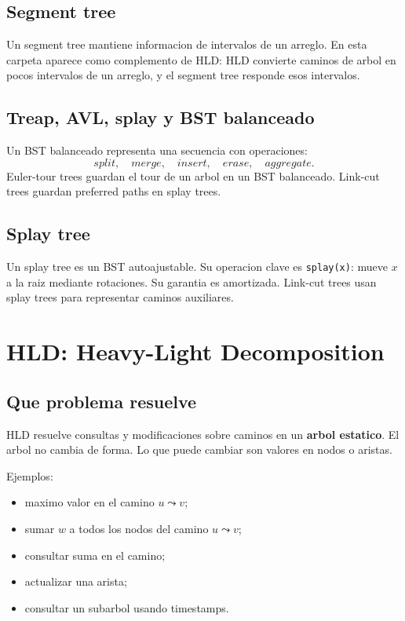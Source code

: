 \documentclass[10pt]{article}
\begin{document}
\subsection{Segment tree}
Un segment tree mantiene informacion de intervalos de un arreglo. En esta
carpeta aparece como complemento de HLD: HLD convierte caminos de arbol en
pocos intervalos de un arreglo, y el segment tree responde esos intervalos.

\subsection{Treap, AVL, splay y BST balanceado}
Un BST balanceado representa una secuencia con operaciones:
\[
split,\quad merge,\quad insert,\quad erase,\quad aggregate.
\]
Euler-tour trees guardan el tour de un arbol en un BST balanceado. Link-cut
trees guardan preferred paths en splay trees.

\subsection{Splay tree}
Un splay tree es un BST autoajustable. Su operacion clave es \texttt{splay(x)}:
mueve $x$ a la raiz mediante rotaciones. Su garantia es amortizada. Link-cut
trees usan splay trees para representar caminos auxiliares.

\newpage
\section{HLD: Heavy-Light Decomposition}

\subsection{Que problema resuelve}
HLD resuelve consultas y modificaciones sobre caminos en un \textbf{arbol
estatico}. El arbol no cambia de forma. Lo que puede cambiar son valores en
nodos o aristas.

Ejemplos:
\begin{itemize}[leftmargin=*]
\item maximo valor en el camino $u\leadsto v$;
\item sumar $w$ a todos los nodos del camino $u\leadsto v$;
\item consultar suma en el camino;
\item actualizar una arista;
\item consultar un subarbol usando timestamps.
\end{itemize}
\end{document}
